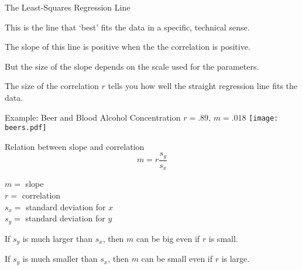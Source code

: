\documentclass{beamer}
\begin{document}
\begin{frame}{The Least-Squares Regression Line}

This is the line that `best' fits the data in a specific,
technical sense.  

\vfill

The slope of this line is positive when the the correlation is
positive. 

\vfill
But the size of the slope depends on the scale used for the
parameters.

\vfill
The size of the correlation $r$ tells you how well the straight
regression line fits the data.
\end{frame}

\begin{frame}{Example:  Beer and Blood Alcohol Concentration}
$r = .89$,  $m = .018$
\texttt{[image: beers.pdf]}

\end{frame}



\begin{frame}{Relation between slope and correlation}
$$m = r \frac{s_y}{s_x}$$

\noindent
$m =$ slope \\
$r =$ correlation\\
$s_x =$  standard deviation for $x$ \\
$s_y =$  standard deviation for $y$

\vfill
If $s_y$ is much larger than $s_x$, then $m$ can be big
even if $r$ is small.

\vfill
If $s_y$ is much smaller than $s_x$, then $m$ can be small
even if $r$ is large.
\end{frame}
\end{document}
